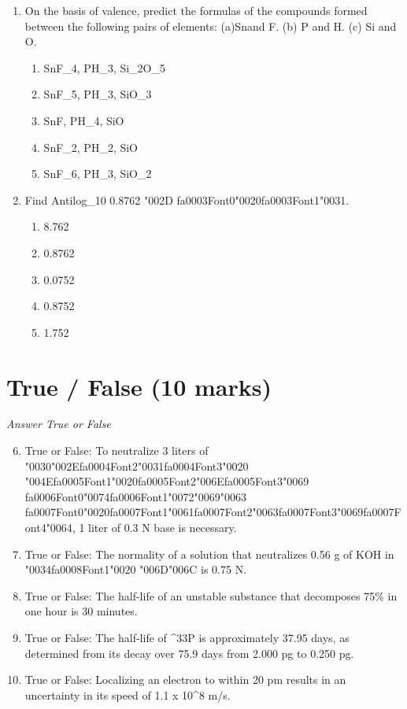 \documentclass[12pt]{article}
\begin{document}
\begin{enumerate}[label=\arabic*.]
\item On the basis of valence, predict the formulas of the compounds formed between the
following pairs of elements: (a)Snand F. (b) P and H. (c) Si and O.
\begin{enumerate}[label=(\alph*)]
    \item SnF\_4, PH\_3, Si\_2O\_5
    \item SnF\_5, PH\_3, SiO\_3
    \item SnF, PH\_4, SiO
    \item SnF\_2, PH\_2, SiO
    \item SnF\_6, PH\_3, SiO\_2
\end{enumerate}
\item Find Antilog\_10 0.8762 {\char"002D} {\csname fa0003Font0\endcsname\char"0020}{\csname fa0003Font1\endcsname\char"0031}.
\begin{enumerate}[label=(\alph*)]
    \item 8.762
    \item 0.8762
    \item 0.0752
    \item 0.8752
    \item 1.752
\end{enumerate}
\end{enumerate}

\section*{True / False (10 marks)}
\textit{Answer True or False}
\begin{enumerate}[label=\arabic*.]
\setcounter{enumi}{5}
\item True or False: To neutralize 3 liters of {\char"0030}{\char"002E}{\csname fa0004Font2\endcsname\char"0031}{\csname fa0004Font3\endcsname\char"0020} {\char"004E}{\csname fa0005Font1\endcsname\char"0020}{\csname fa0005Font2\endcsname\char"006E}{\csname fa0005Font3\endcsname\char"0069} {\csname fa0006Font0\endcsname\char"0074}{\csname fa0006Font1\endcsname\char"0072}{\char"0069}{\char"0063} {\csname fa0007Font0\endcsname\char"0020}{\csname fa0007Font1\endcsname\char"0061}{\csname fa0007Font2\endcsname\char"0063}{\csname fa0007Font3\endcsname\char"0069}{\csname fa0007Font4\endcsname\char"0064}, 1 liter of 0.3 N base is necessary.
\item True or False: The normality of a solution that neutralizes 0.56 g of KOH in {\char"0034}{\csname fa0008Font1\endcsname\char"0020} {\char"006D}{\char"006C} is 0.75 N.
\item True or False: The half-life of an unstable substance that decomposes 75\% in one hour is 30 minutes.
\item True or False: The half-life of \^{}33P is approximately 37.95 days, as determined from its decay over 75.9 days from 2.000 pg to 0.250 pg.
\item True or False: Localizing an electron to within 20 pm results in an uncertainty in its speed of 1.1 x 10\^{}8 m/s.
\end{enumerate}
\end{document}
